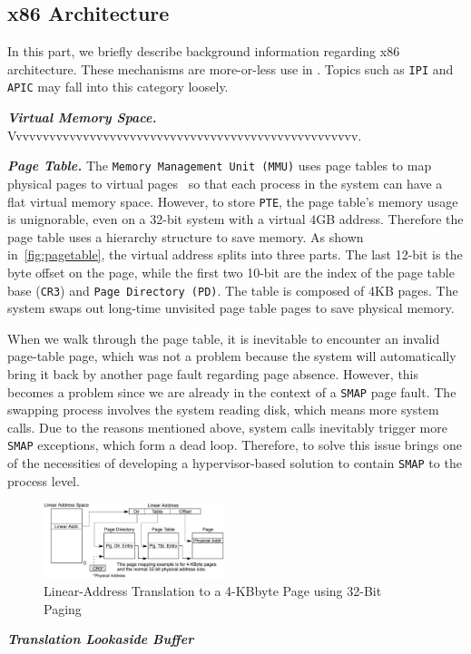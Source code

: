 \subsection{x86 Architecture}

In this part, we briefly describe background information regarding x86 architecture. These mechanisms are more-or-less use in \name. Topics such as \texttt{IPI} and \texttt{APIC} may fall into this category loosely.

\textbf{\textit{Virtual Memory Space.}} Vvvvvvvvvvvvvvvvvvvvvvvvvvvvvvvvvvvvvvvvvvvvvvvvvvvv.



\textbf{\textit{Page Table.}} The \texttt{Memory Management Unit (MMU)} uses page tables to map physical pages to virtual pages~\cite{intelpaging} so that each process in the system can have a flat virtual memory space. However, to store \texttt{PTE}, the page table's memory usage is unignorable, even on a 32-bit system with a virtual 4GB address. Therefore the page table uses a hierarchy structure to save memory. As shown in~\autoref{fig:pagetable}, the virtual address splits into three parts. The last 12-bit is the byte offset on the page, while the first two 10-bit are the index of the page table base (\texttt{CR3}) and \texttt{Page Directory (PD)}. The table is composed of 4KB pages.  The system swaps out long-time unvisited page table pages to save physical memory. 


When we walk through the page table, it is inevitable to encounter an invalid page-table page, which was not a problem because the system will automatically bring it back by another page fault regarding page absence. However, this becomes a problem since we are already in the context of a \texttt{SMAP} page fault. The swapping process involves the system reading disk, which means more system calls. Due to the reasons mentioned above, system calls inevitably trigger more \texttt{SMAP} exceptions, which form a dead loop. Therefore, to solve this issue brings one of the necessities of developing a hypervisor-based solution to contain \texttt{SMAP} to the process level. 



\begin{figure}[th]
  \includegraphics[width=0.47\textwidth]{figures/pagetable}
  \centering
  \caption{Linear-Address Translation to a 4-KBbyte Page using 32-Bit Paging~\cite{guide2011intel}}
  \label{fig:pagetable}
\end{figure}
\textbf{\textit{Translation Lookaside Buffer}}


